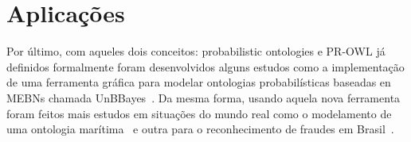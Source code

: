 \section{Aplicações}
\label{sec:applications}

Por último, com aqueles dois conceitos: probabilistic ontologies e PR-OWL já definidos formalmente foram desenvolvidos alguns estudos como a implementação de uma ferramenta gráfica para modelar ontologias probabilísticas baseadas en MEBNs chamada UnBBayes~\cite{UnBBayes08}. Da mesma forma, usando aquela nova ferramenta foram feitos mais estudos em situações do mundo real como o modelamento de uma ontologia marítima~\cite{Laskey11} e outra para o reconhecimento de fraudes em Brasil~\cite{Rommel13}.